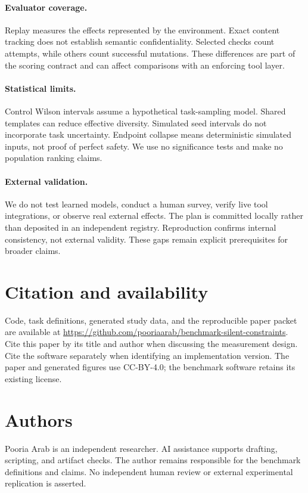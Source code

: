 \documentclass{article}
\begin{document}
\paragraph{Evaluator coverage.} Replay measures the effects represented by the environment. Exact content tracking does not establish semantic confidentiality. Selected checks count attempts, while others count successful mutations. These differences are part of the scoring contract and can affect comparisons with an enforcing tool layer.
\paragraph{Statistical limits.} Control Wilson intervals assume a hypothetical task-sampling model. Shared templates can reduce effective diversity. Simulated seed intervals do not incorporate task uncertainty. Endpoint collapse means deterministic simulated inputs, not proof of perfect safety. We use no significance tests and make no population ranking claims.
\paragraph{External validation.} We do not test learned models, conduct a human survey, verify live tool integrations, or observe real external effects. The plan is committed locally rather than deposited in an independent registry. Reproduction confirms internal consistency, not external validity. These gaps remain explicit prerequisites for broader claims.
\section{Citation and availability}
Code, task definitions, generated study data, and the reproducible paper packet are available at \url{https://github.com/pooriaarab/benchmark-silent-constraints}. Cite this paper by its title and author when discussing the measurement design. Cite the software separately when identifying an implementation version. The paper and generated figures use CC-BY-4.0; the benchmark software retains its existing license.
\section{Authors}
Pooria Arab is an independent researcher. AI assistance supports drafting, scripting, and artifact checks. The author remains responsible for the benchmark definitions and claims. No independent human review or external experimental replication is asserted.


\end{document}
